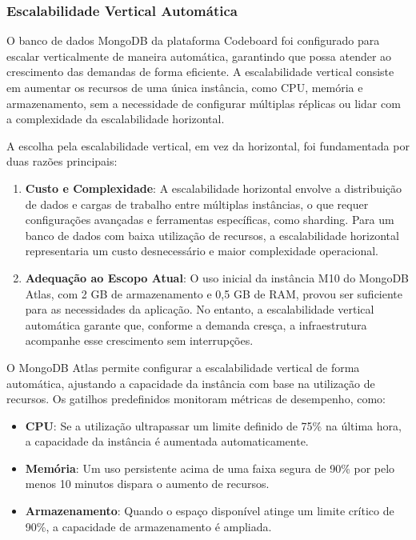 \subsubsection{Escalabilidade Vertical Automática}

O banco de dados MongoDB da plataforma Codeboard foi configurado para escalar verticalmente de maneira automática, garantindo que possa atender ao crescimento das demandas de forma eficiente. A escalabilidade vertical consiste em aumentar os recursos de uma única instância, como CPU, memória e armazenamento, sem a necessidade de configurar múltiplas réplicas ou lidar com a complexidade da escalabilidade horizontal.

A escolha pela escalabilidade vertical, em vez da horizontal, foi fundamentada por duas razões principais:
\begin{enumerate}
    \item \textbf{Custo e Complexidade}: A escalabilidade horizontal envolve a distribuição de dados e cargas de trabalho entre múltiplas instâncias, o que requer configurações avançadas e ferramentas específicas, como sharding. Para um banco de dados com baixa utilização de recursos, a escalabilidade horizontal representaria um custo desnecessário e maior complexidade operacional.
    \item \textbf{Adequação ao Escopo Atual}: O uso inicial da instância M10 do MongoDB Atlas, com 2 GB de armazenamento e 0,5 GB de RAM, provou ser suficiente para as necessidades da aplicação. No entanto, a escalabilidade vertical automática garante que, conforme a demanda cresça, a infraestrutura acompanhe esse crescimento sem interrupções.
\end{enumerate}

O MongoDB Atlas permite configurar a escalabilidade vertical de forma automática, ajustando a capacidade da instância com base na utilização de recursos. Os gatilhos predefinidos monitoram métricas de desempenho, como:
\begin{itemize}
    \item \textbf{CPU}: Se a utilização ultrapassar um limite definido de 75\% na última hora, a capacidade da instância é aumentada automaticamente.
    \item \textbf{Memória}: Um uso persistente acima de uma faixa segura de 90\% por pelo menos 10 minutos dispara o aumento de recursos.
    \item \textbf{Armazenamento}: Quando o espaço disponível atinge um limite crítico de 90\%, a capacidade de armazenamento é ampliada. 
\end{itemize}



